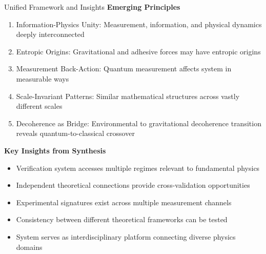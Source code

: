 \documentclass{beamer}
\begin{document}
\begin{frame}{Unified Framework and Insights}
\textbf{Emerging Principles}
\begin{enumerate}
\item Information-Physics Unity: Measurement, information, and physical dynamics deeply interconnected
\item Entropic Origins: Gravitational and adhesive forces may have entropic origins
\item Measurement Back-Action: Quantum measurement affects system in measurable ways
\item Scale-Invariant Patterns: Similar mathematical structures across vastly different scales
\item Decoherence as Bridge: Environmental to gravitational decoherence transition reveals quantum-to-classical crossover
\end{enumerate}

\textbf{Key Insights from Synthesis}
\begin{itemize}
\item Verification system accesses multiple regimes relevant to fundamental physics
\item Independent theoretical connections provide cross-validation opportunities
\item Experimental signatures exist across multiple measurement channels
\item Consistency between different theoretical frameworks can be tested
\item System serves as interdisciplinary platform connecting diverse physics domains
\end{itemize}
\end{frame}
\end{document}
